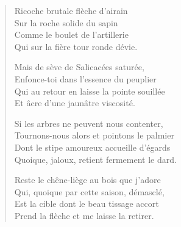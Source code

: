 \begin{verse}\quatrain%
  Ricoche brutale flèche d’airain\\  %
  Sur la roche solide du sapin\\  %
  Comme le boulet de l’artillerie\\  %
  Qui sur la fière tour  ronde dévie.\label{foot.tourRonde} 

  Mais de sève de Salicacées saturée,\\  %
  Enfonce-toi dans l’essence du peuplier\\  %
  Qui au retour en laisse la pointe souillée\\  %
  Et âcre d’une jaunâtre viscosité.

  Si les arbres ne peuvent nous contenter,\\  %
  Tournons-nous alors et pointons le palmier\\  %
  Dont le stipe amoureux accueille d’égards\\  %
  Quoique, jaloux, retient fermement le dard.

  Reste le chêne-liège au bois que j’adore\\  %
  Qui, quoique par cette saison, démasclé,\\  %
  Est la cible dont le beau tissage accort\\  %
  Prend la flèche et me laisse la retirer.    %
\end{verse}


